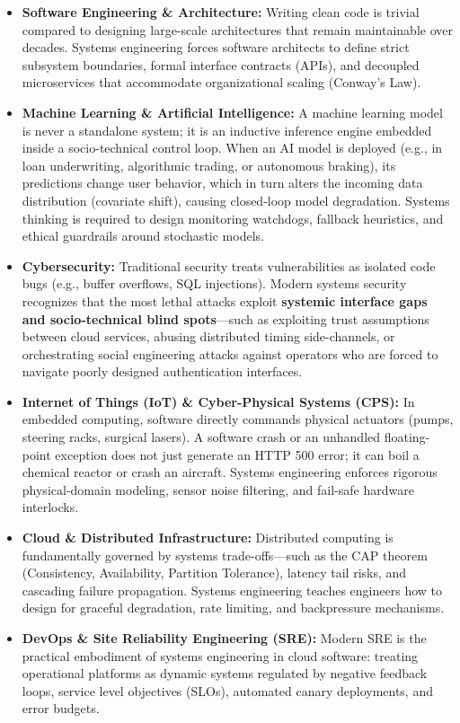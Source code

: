 \begin{itemize}[leftmargin=1.5em]
    \item \textbf{Software Engineering \& Architecture:} Writing clean code is trivial compared to designing large-scale architectures that remain maintainable over decades. Systems engineering forces software architects to define strict subsystem boundaries, formal interface contracts (APIs), and decoupled microservices that accommodate organizational scaling (Conway's Law).
    \item \textbf{Machine Learning \& Artificial Intelligence:} A machine learning model is never a standalone system; it is an inductive inference engine embedded inside a socio-technical control loop. When an AI model is deployed (e.g., in loan underwriting, algorithmic trading, or autonomous braking), its predictions change user behavior, which in turn alters the incoming data distribution (covariate shift), causing closed-loop model degradation. Systems thinking is required to design monitoring watchdogs, fallback heuristics, and ethical guardrails around stochastic models.
    \item \textbf{Cybersecurity:} Traditional security treats vulnerabilities as isolated code bugs (e.g., buffer overflows, SQL injections). Modern systems security recognizes that the most lethal attacks exploit \textbf{systemic interface gaps and socio-technical blind spots}—such as exploiting trust assumptions between cloud services, abusing distributed timing side-channels, or orchestrating social engineering attacks against operators who are forced to navigate poorly designed authentication interfaces.
    \item \textbf{Internet of Things (IoT) \& Cyber-Physical Systems (CPS):} In embedded computing, software directly commands physical actuators (pumps, steering racks, surgical lasers). A software crash or an unhandled floating-point exception does not just generate an HTTP 500 error; it can boil a chemical reactor or crash an aircraft. Systems engineering enforces rigorous physical-domain modeling, sensor noise filtering, and fail-safe hardware interlocks.
    \item \textbf{Cloud \& Distributed Infrastructure:} Distributed computing is fundamentally governed by systems trade-offs—such as the CAP theorem (Consistency, Availability, Partition Tolerance), latency tail risks, and cascading failure propagation. Systems engineering teaches engineers how to design for graceful degradation, rate limiting, and backpressure mechanisms.
    \item \textbf{DevOps \& Site Reliability Engineering (SRE):} Modern SRE is the practical embodiment of systems engineering in cloud software: treating operational platforms as dynamic systems regulated by negative feedback loops, service level objectives (SLOs), automated canary deployments, and error budgets.
\end{itemize}

